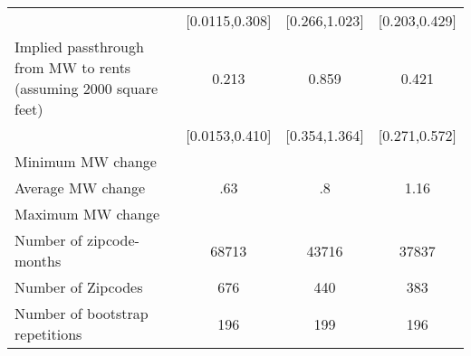 {\begin{tabular}{l*{3}{c}}
            &        [0.0115,0.308]         &         [0.266,1.023]         &         [0.203,0.429]         \\
[1em]
Implied passthrough from MW to rents (assuming 2000 square feet)&                 0.213\sym{*}  &                 0.859\sym{***}&                 0.421\sym{***}\\
            &        [0.0153,0.410]         &         [0.354,1.364]         &         [0.271,0.572]         \\
\hline
Minimum MW change&                               &                               &                               \\
Average MW change&                   .63         &                    .8         &                  1.16         \\
Maximum MW change&                               &                               &                               \\
Number of zipcode-months&                 68713         &                 43716         &                 37837         \\
Number of Zipcodes&                   676         &                   440         &                   383         \\
Number of bootstrap repetitions&                   196         &                   199         &                   196         \\
\hline\hline
\end{tabular}
}
